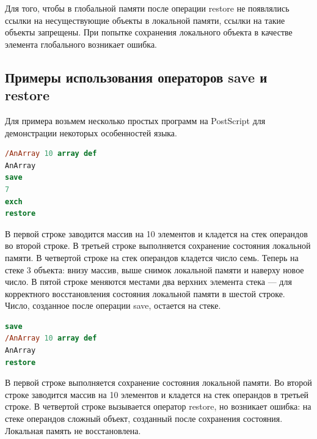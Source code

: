 Для того, чтобы в глобальной памяти после операции restore не появлялись ссылки на несуществующие объекты в локальной памяти, ссылки на такие объекты запрещены. При попытке сохранения локального объекта в качестве элемента глобального возникает ошибка.


\subsection{Примеры использования операторов save и restore}

Для примера возьмем несколько простых программ на PostScript для демонстрации некоторых особенностей языка. 


\begin{lstlisting}[label=PostScript-example3,caption=Простой объект на стеке операндов после операции save, language = PostScript]
/AnArray 10 array def
AnArray
save
7
exch
restore
\end{lstlisting}

В первой строке заводится массив на 10 элементов и кладется на стек операндов во второй строке. В третьей строке выполняется сохранение состояния локальной памяти. В четвертой строке на стек операндов кладется число семь. Теперь на стеке 3 объекта: внизу массив, выше снимок локальной памяти и наверху новое число. В пятой строке меняются местами два верхних элемента стека --- для корректного восстановления состояния локальной памяти в шестой строке. Число, созданное после операции save, остается на стеке.


\begin{lstlisting}[label=PostScript-example4,caption=Сложный объект на стеке операндов после операции save, language = PostScript]
save
/AnArray 10 array def
AnArray
restore
\end{lstlisting}

В первой строке выполняется сохранение состояния локальной памяти. Во второй строке заводится массив на 10 элементов и кладется на стек операндов в третьей строке. В четвертой строке вызывается оператор restore, но возникает ошибка: на стеке операндов сложный объект, созданный после сохранения состояния. Локальная память не восстановлена.


